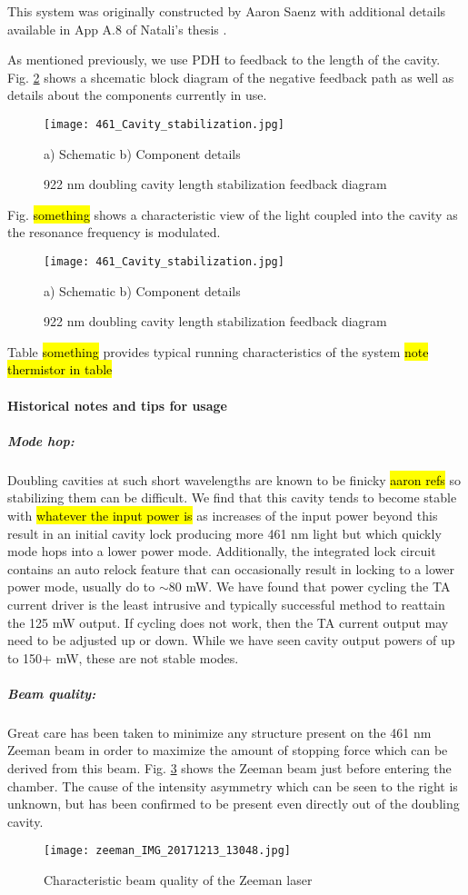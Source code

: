 This system was originally constructed by Aaron Saenz \cite{AaronDSaenz2005} with additional details available in App A.8 of Natali's thesis \cite{MartinezdeEscolar2010}.

As mentioned previously, we use PDH to feedback to the length of the cavity. 
Fig. \ref{fig:922cavityLock} shows a shcematic block diagram of the negative feedback path as well as details about the components currently in use.
	\begin{figure}
		\centerline{
		\texttt{[image: 461\_Cavity\_stabilization.jpg]}}
		\caption{922 nm doubling cavity length stabilization feedback diagram}{a) Schematic b) Component details}
		\label{fig:922cavityLock}
	\end{figure}
	
Fig. \hl{something} shows a characteristic view of the light coupled into the cavity as the resonance frequency is modulated.
	\begin{figure}
		\centerline{
		\texttt{[image: 461\_Cavity\_stabilization.jpg]}}
		\caption{922 nm doubling cavity length stabilization feedback diagram}{a) Schematic b) Component details}
		\label{fig:922cavityLock}
	\end{figure}

Table \hl{something} provides typical running characteristics of the system \hl{note thermistor in table}

\paragraph{Historical notes and tips for usage}
\subparagraph{Mode hop:} 
Doubling cavities at such short wavelengths are known to be finicky \hl{aaron refs} so stabilizing them can be difficult. 
We find that this cavity tends to become stable with \hl{whatever the input power is} as increases of the input power beyond this result in an initial cavity lock producing more 461 nm light but which quickly mode hops into a lower power mode.
Additionally, the integrated lock circuit contains an auto relock feature that can occasionally result in locking to a lower power mode, usually do to $\sim$80 mW.
We have found that power cycling the TA current driver is the least intrusive and typically successful method to reattain the 125 mW output.
If cycling does not work, then the TA current output may need to be adjusted up or down.
While we have seen cavity output powers of up to 150+ mW, these are not stable modes.

\subparagraph{Beam quality:}
Great care has been taken to minimize any structure present on the 461 nm Zeeman beam in order to maximize the amount of stopping force which can be derived from this beam.
Fig. \ref{fig:461zeemanBeam} shows the Zeeman beam just before entering the chamber.
The cause of the intensity asymmetry which can be seen to the right is unknown, but has been confirmed to be present even directly out of the doubling cavity.
	\begin{figure}
		\centerline{
		\texttt{[image: zeeman\_IMG\_20171213\_13048.jpg]}}
		\caption{Characteristic beam quality of the Zeeman laser}
		\label{fig:461zeemanBeam}
	\end{figure}

